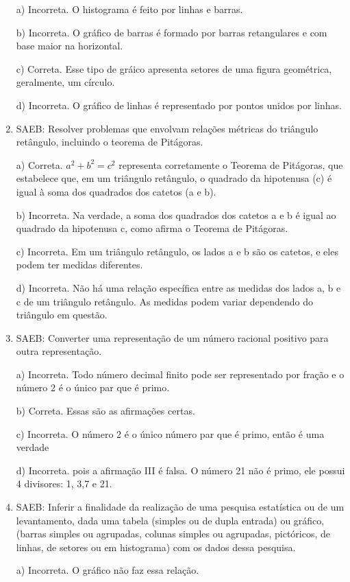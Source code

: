 \begin{enumerate}
a) Incorreta. O histograma é feito por linhas e barras.

b) Incorreta. O gráfico de barras é formado por barras retangulares
e com base maior na horizontal.

c) Correta. Esse tipo de gráico apresenta setores de uma figura
geométrica, geralmente, um círculo.

d) Incorreta. O gráfico de linhas é representado por pontos unidos
por linhas.

\item SAEB: Resolver problemas que envolvam relações métricas do triângulo
retângulo, incluindo o teorema de Pitágoras.

a) Correta. $a^2 + b^2 = c^2$ representa corretamente o Teorema de
Pitágoras, que estabelece que, em um triângulo retângulo, o quadrado da
hipotenusa (c) é igual à soma dos quadrados dos catetos (a e b).

b) Incorreta. Na verdade, a soma dos quadrados dos catetos a e b é
igual ao quadrado da hipotenusa c, como afirma o Teorema de Pitágoras.

c) Incorreta. Em um triângulo retângulo, os lados a e b são os
catetos, e eles podem ter medidas diferentes.

d) Incorreta. Não há uma relação específica entre as medidas dos
lados a, b e c de um triângulo retângulo. As medidas podem variar
dependendo do triângulo em questão.

\item SAEB: Converter uma representação de um número racional positivo para
outra representação.

a) Incorreta. Todo número decimal finito pode ser representado por
fração e o número 2 é o único par que é primo.

b) Correta. Essas são as afirmações certas.

c) Incorreta. O número 2 é o único número par que é primo, então é
uma verdade

d) Incorreta. pois a afirmação III é falsa. O número 21 não é primo, ele
possui 4 divisores: 1, 3,7 e 21.

\item SAEB: Inferir a finalidade da realização de uma pesquisa estatística ou
de um levantamento, dada uma tabela (simples ou de dupla entrada) ou
gráfico, (barras simples ou agrupadas, colunas simples ou agrupadas,
pictóricos, de linhas, de setores ou em histograma) com os dados dessa
pesquisa.

a) Incorreta. O gráfico não faz essa relação.


\end{enumerate}
